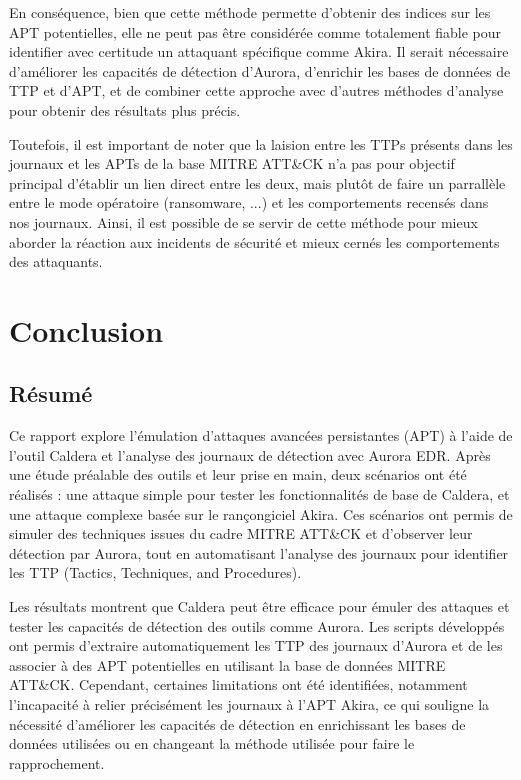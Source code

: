 \documentclass[12pt,letterpaper]{article}
\begin{document}
\bigskip

En conséquence, bien que cette méthode permette d'obtenir des indices sur les APT potentielles, elle ne peut pas être considérée comme totalement fiable pour identifier avec certitude un attaquant spécifique comme Akira.
Il serait nécessaire d'améliorer les capacités de détection d'Aurora, d'enrichir les bases de données de TTP et d'APT, et de combiner cette approche avec d'autres méthodes d'analyse pour obtenir des résultats plus précis.

\bigskip

Toutefois, il est important de noter que la laision entre les TTPs présents dans les journaux et les APTs de la base MITRE ATT\&CK n'a pas pour objectif principal d'établir un lien direct entre les deux, mais plutôt de faire un parrallèle entre le mode opératoire (ransomware, ...) et les comportements recensés dans nos journaux.
Ainsi, il est possible de se servir de cette méthode pour mieux aborder la réaction aux incidents de sécurité et mieux cernés les comportements des attaquants.

\newpage
\section{Conclusion}

\subsection{Résumé}
Ce rapport explore l'émulation d'attaques avancées persistantes (APT) à l'aide de l'outil Caldera et l'analyse des journaux de détection avec Aurora EDR.
Après une étude préalable des outils et leur prise en main, deux scénarios ont été réalisés : une attaque simple pour tester les fonctionnalités de base de Caldera, et une attaque complexe basée sur le rançongiciel Akira.
Ces scénarios ont permis de simuler des techniques issues du cadre MITRE ATT\&CK et d'observer leur détection par Aurora, tout en automatisant l'analyse des journaux pour identifier les TTP (Tactics, Techniques, and Procedures).

\bigskip

Les résultats montrent que Caldera peut être efficace pour émuler des attaques et tester les capacités de détection des outils comme Aurora.
Les scripts développés ont permis d'extraire automatiquement les TTP des journaux d'Aurora et de les associer à des APT potentielles en utilisant la base de données MITRE ATT\&CK.
Cependant, certaines limitations ont été identifiées, notamment l'incapacité à relier précisément les journaux à l'APT Akira, ce qui souligne la nécessité d'améliorer les capacités de détection en enrichissant les bases de données utilisées ou en changeant la méthode utilisée pour faire le rapprochement.
\end{document}
